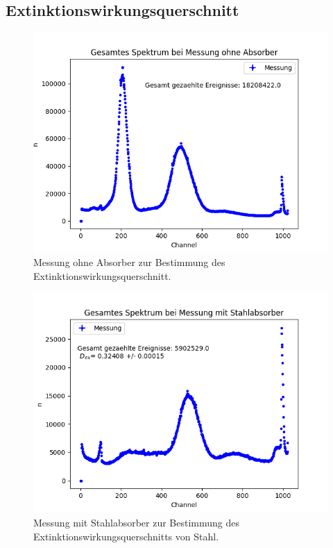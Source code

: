 \documentclass[12pt,a4paper]{article}
\begin{document}
\subsection{Extinktionswirkungsquerschnitt}
\label{ex}
\begin{figure}
\centering
\includegraphics[scale=0.8]{Bilder/Extinktion/OhneAbsorber.png}
\caption{Messung ohne Absorber zur Bestimmung des Extinktionswirkungsquerschnitt.}
\label{fig:Extinktion_ohneAbsorber}
\end{figure}

\begin{figure}
\centering
\includegraphics[scale=0.8]{Bilder/Extinktion/Stahl.png}
\caption{Messung mit Stahlabsorber zur Bestimmung des Extinktionswirkungsquerschnitts von Stahl.}
\label{fig:Extinktion_Stahl}
\end{figure}
\end{document}
